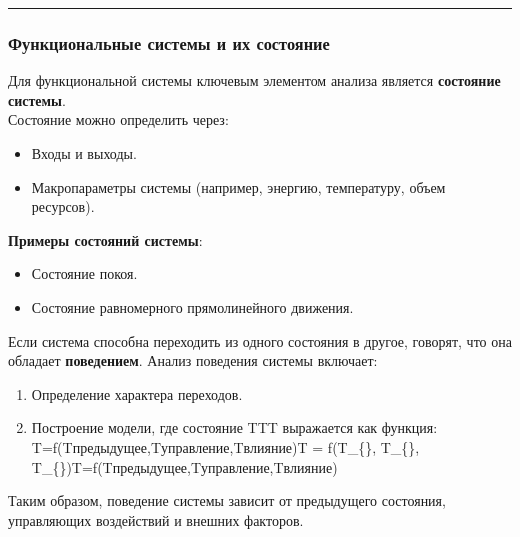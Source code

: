 \documentclass[
]{article}
\providecommand{\tightlist}{%
  \setlength{\itemsep}{0pt}\setlength{\parskip}{0pt}}
\begin{document}
\begin{center}\rule{0.5\linewidth}{0.5pt}\end{center}

\subsubsection{\texorpdfstring{\textbf{Функциональные системы и их
состояние}}{Функциональные системы и их состояние}}\label{ux444ux443ux43dux43aux446ux438ux43eux43dux430ux43bux44cux43dux44bux435-ux441ux438ux441ux442ux435ux43cux44b-ux438-ux438ux445-ux441ux43eux441ux442ux43eux44fux43dux438ux435}

Для функциональной системы ключевым элементом анализа является
\textbf{состояние системы}.\\
Состояние можно определить через:

\begin{itemize}
\tightlist
\item
  Входы и выходы.
\item
  Макропараметры системы (например, энергию, температуру, объем
  ресурсов).
\end{itemize}

\textbf{Примеры состояний системы}:

\begin{itemize}
\tightlist
\item
  Состояние покоя.
\item
  Состояние равномерного прямолинейного движения.
\end{itemize}

Если система способна переходить из одного состояния в другое, говорят,
что она обладает \textbf{поведением}. Анализ поведения системы включает:

\begin{enumerate}
\def\labelenumi{\arabic{enumi}.}
\tightlist
\item
  Определение характера переходов.
\item
  Построение модели, где состояние TTT выражается как функция:
  T=f(Tпредыдущее,Tуправление,Tвлияние)T = f(T\_\{\},
  T\_\{\},
  T\_\{\})T=f(Tпредыдущее\hspace{0pt},Tуправление\hspace{0pt},Tвлияние\hspace{0pt})
\end{enumerate}

Таким образом, поведение системы зависит от предыдущего состояния,
управляющих воздействий и внешних факторов.
\end{document}
